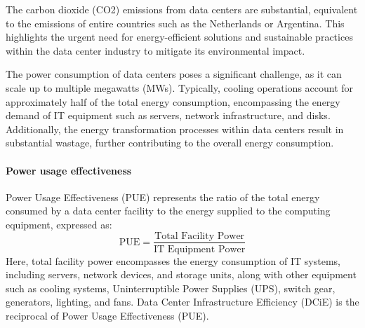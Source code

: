 The carbon dioxide (CO2) emissions from data centers are substantial, equivalent to the emissions of entire countries such as the Netherlands or Argentina. 
This highlights the urgent need for energy-efficient solutions and sustainable practices within the data center industry to mitigate its environmental impact.

The power consumption of data centers poses a significant challenge, as it can scale up to multiple megawatts (MWs). 
Typically, cooling operations account for approximately half of the total energy consumption, encompassing the energy demand of IT equipment such as servers, network infrastructure, and disks. 
Additionally, the energy transformation processes within data centers result in substantial wastage, further contributing to the overall energy consumption.

\paragraph*{Power usage effectiveness}
Power Usage Effectiveness (PUE) represents the ratio of the total energy consumed by a data center facility to the energy supplied to the computing equipment, expressed as:
\[\text{PUE}=\dfrac{\text{Total Facility Power}}{\text{IT Equipment Power}}\]
Here, total facility power encompasses the energy consumption of IT systems, including servers, network devices, and storage units, along with other equipment such as cooling systems, Uninterruptible Power Supplies (UPS), switch gear, generators, lighting, and fans.
Data Center Infrastructure Efficiency (DCiE) is the reciprocal of Power Usage Effectiveness (PUE).


